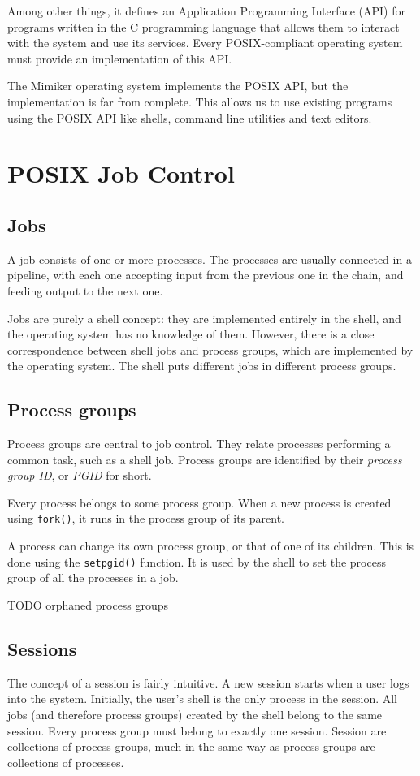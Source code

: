 \documentclass[shortabstract, manyadvisors, english, mgr]{iithesis}
\begin{document}
Among other things, it defines an Application Programming Interface (API) for
programs written in the C programming language that allows them to interact with
the system and use its services. Every POSIX-compliant operating system must
provide an implementation of this API.

The Mimiker operating system implements the POSIX API, but the implementation is
far from complete. This allows us to use existing programs using the POSIX API
like shells, command line utilities and text editors.

\section{POSIX Job Control}

\subsection{Jobs}
A job consists of one or more processes. The processes are usually connected in
a pipeline, with each one accepting input from the previous one in the chain,
and feeding output to the next one.

Jobs are purely a shell concept: they are implemented entirely in the shell,
and the operating system has no knowledge of them. However, there is a close
correspondence between shell jobs and process groups, which are implemented by
the operating system. The shell puts different jobs in different process groups.

\subsection{Process groups}
Process groups are central to job control. They relate processes performing a
common task, such as a shell job. Process groups are identified by their
\textit{process group ID}, or \textit{PGID} for short.

Every process belongs to some process group. When a new process is created using
\texttt{fork()}\cite{fork}, it runs in the process group of its parent.

A process can change its own process group, or that of one of its children. This
is done using the \texttt{setpgid()}\cite{setpgid} function. It is used by the shell to set
the process group of all the processes in a job.

TODO orphaned process groups
\subsection{Sessions}
The concept of a session is fairly intuitive.
A new session starts when a user logs into the system. Initially, the user's
shell is the only process in the session. All jobs (and therefore process
groups) created by the shell belong to the same session. Every process group
must belong to exactly one session. Session are collections of process groups,
much in the same way as process groups are collections of processes.
\end{document}
